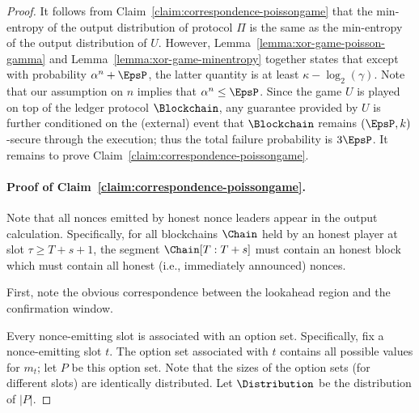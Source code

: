 \begin{proof}
	It follows from Claim~\ref{claim:correspondence-poissongame} that the 
	min-entropy of the output distribution of 
	protocol $\Pi$ 
	is the same as 
	the min-entropy of the output distribution of $U$. 
	However, 
	Lemma~\ref{lemma:xor-game-poisson-gamma} and 
	Lemma~\ref{lemma:xor-game-minentropy} together 
	states that 
	except with probability $\alpha^n + \EpsP$, 
	the latter quantity is at least $\kappa - \log_2(\gamma)$. 
	Note that our assumption on $n$ implies that $\alpha^n \leq \EpsP$.
	Since the game $U$ is played on top of 
	the ledger protocol $\Blockchain$, 
	any guarantee provided by $U$ is 
	further conditioned on the (external) event that 
	$\Blockchain$ remains $(\EpsP, k)$-secure through the execution; 
	thus the total failure probability is $3 \EpsP$.
	It remains to prove Claim~\ref{claim:correspondence-poissongame}.


	\paragraph{Proof of Claim~\ref{claim:correspondence-poissongame}.}
		Note that all nonces emitted by honest nonce leaders appear in the output calculation. 
		Specifically, for all blockchains $\Chain$ 
		held by an honest player at slot $\tau \geq T +  s + 1$, 
		the segment $\Chain[T:T+s]$ must contain an honest block 
		which must contain all honest (i.e., immediately announced) nonces. 

		First, note the {\color{red}obvious} correspondence 
		between the lookahead region and the confirmation window.


		Every nonce-emitting slot is associated with an option set. 
		Specifically, fix a nonce-emitting slot $t$. 
		The option set associated with $t$ 
		contains all possible values for $m_t$; let $P$ be this option set. 
		Note that the sizes of the option sets (for different slots) 
		are identically distributed.
		Let $\Distribution$ be the distribution of $|P|$. 
		

\end{proof}

